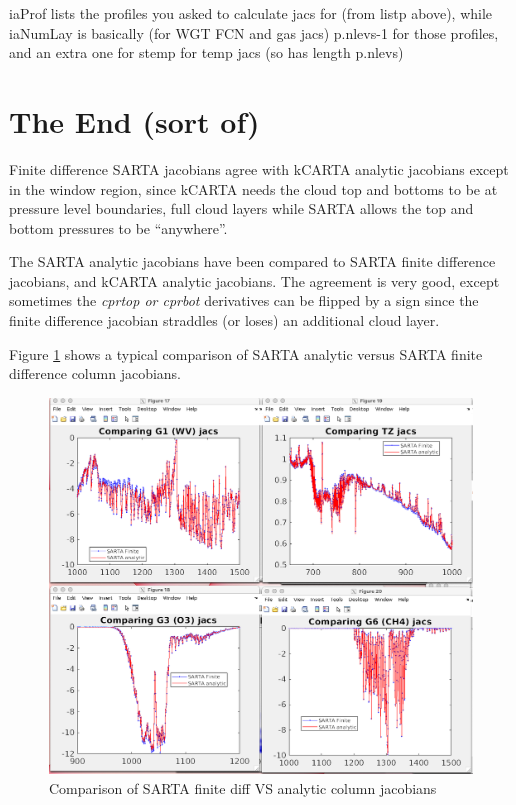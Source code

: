 \documentclass[11pt]{article}
\newcommand{\kc}{\textsf{kCARTA}\xspace}
\newcommand{\sa}{\textsf{SARTA}\xspace}
\begin{document}
iaProf lists the profiles you asked to calculate jacs for (from listp
above), while iaNumLay is basically (for WGT FCN and gas jacs)
p.nlevs-1 for those profiles, and an extra one for stemp for temp jacs
(so has length p.nlevs)

\section{The End (sort of)}

Finite difference \sa jacobians agree with kCARTA analytic jacobians
except in the window region, since \kc needs the cloud top and bottoms
to be at pressure level boundaries, full cloud layers while \sa allows
the top and bottom pressures to be ``anywhere''. 

The \sa analytic jacobians have been compared to \sa finite difference
jacobians, and kCARTA analytic jacobians. The agreement is very good,
except sometimes the \textit{cprtop or cprbot} derivatives can be
flipped by a sign since the finite difference jacobian straddles (or
loses) an additional cloud layer.

Figure \ref{fig:fig3} shows a typical comparison of \sa analytic
versus \sa finite difference column jacobians.

\begin{figure}[ht] \centering
   \includegraphics[width=.75\textwidth]{compare_finite_diff.png}
\caption{Comparison of \sa finite diff VS analytic column jacobians}
\label{fig:fig3}
\end{figure}
\end{document}
